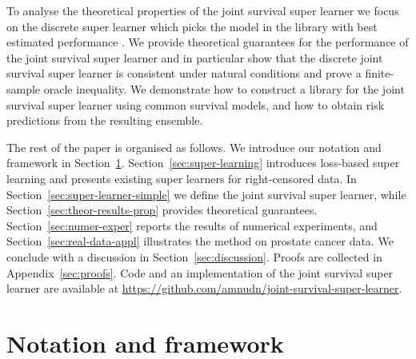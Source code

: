 \documentclass[a4paper,danish]{article}
\theoremstyle{plain} %
\numberwithin{theorem}{section}
\theoremstyle{definition} %
\theoremstyle{remark}
\newcommand{\1}{\mathds{1}}
\begin{document}
To analyse the theoretical properties of the joint survival super learner we
focus on the discrete super learner which picks the model in
the library with best estimated performance
\citep{van2007super}. We provide theoretical guarantees
for the performance of the joint survival super learner and in particular
show that the discrete joint survival super learner is consistent under
natural conditions and prove a finite-sample oracle
inequality. We demonstrate how to construct a library for the joint survival super learner using common survival models, and how to obtain
risk predictions from the resulting ensemble.

The rest of the paper is organised as follows. We introduce our
notation and framework in Section~\ref{sec:framework}.
Section~\ref{sec:super-learning} introduces loss-based super learning
and presents existing super learners for right-censored data. In
Section~\ref{sec:super-learner-simple} we define the joint survival
super learner, while Section~\ref{sec:theor-results-prop} provides
theoretical guarantees. Section~\ref{sec:numer-exper} reports the
results of numerical experiments, and Section~\ref{sec:real-data-appl}
illustrates the method on prostate cancer data. We conclude with a
discussion in Section~\ref{sec:discussion}. Proofs are collected in
Appendix~\ref{sec:proofs}. Code and an implementation of the joint
survival super learner are available at
\url{https://github.com/amnudn/joint-survival-super-learner}.

\section{Notation and framework}
\label{sec:framework}
\end{document}

